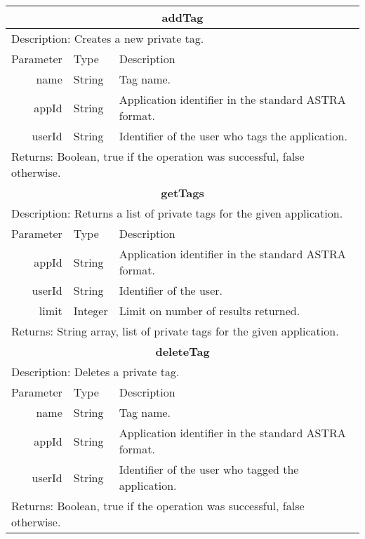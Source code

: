 \begin{table}[h!]
	\small
    \begin{center}
		\begin{tabular}{||r|l|l||}
        
		\hline \hline
		\multicolumn{3}{||c||}{\bfseries{addTag}} \\
		\hline
		\hline 
		\multicolumn{3}{||l||}{Description: Creates a new private tag.} \\
		\hline \hline
			Parameter & Type & Description \\
		\hline \hline
			name & String & Tag name. \\
			appId & String & Application identifier in the standard ASTRA format. \\
			userId & String & Identifier of the user who tags the application. \\
		\hline \hline
		\multicolumn{3}{||l||}{Returns: Boolean, true if the operation was successful,
		false otherwise.} \\ \hline \hline


		\hline \hline
		\multicolumn{3}{||c||}{\bfseries{getTags}} \\
		\hline
		\hline 
		\multicolumn{3}{||l||}{Description: Returns a list of private tags for the
		given application.} \\ 
		\hline \hline 
			Parameter & Type & Description \\
		\hline \hline
			appId & String & Application identifier in the standard ASTRA format. \\
			userId & String & Identifier of the user. \\
			limit & Integer & Limit on number of results returned. \\
		\hline \hline
		\multicolumn{3}{||l||}{Returns: String array, list of private tags for the
		given application.} \\
		\hline
		\hline
		
		\hline \hline
		\multicolumn{3}{||c||}{\bfseries{deleteTag}} \\
		\hline
		\hline 
		\multicolumn{3}{||l||}{Description: Deletes a private tag.} \\
		\hline \hline
			Parameter & Type & Description \\
		\hline \hline
			name & String & Tag name. \\
			appId & String & Application identifier in the standard ASTRA format. \\
			userId & String & Identifier of the user who tagged the application. \\
		\hline \hline
		\multicolumn{3}{||l||}{Returns: Boolean, true if the operation was successful,
		false otherwise.} \\ \hline \hline


\end{tabular}
\end{center}
\end{table}
